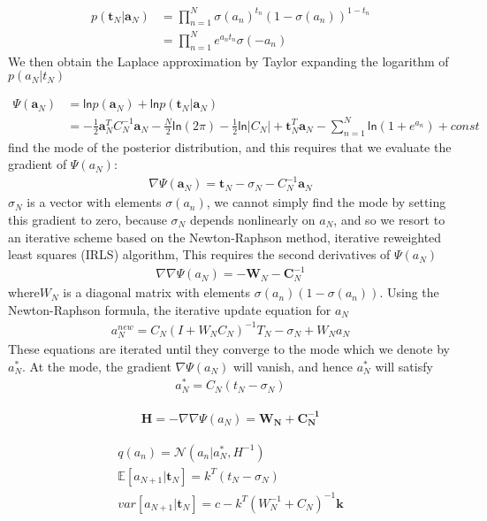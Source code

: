 \documentclass[a4paper]{article}
\begin{document}
\begin{align*}
p(\mathbf{t}_{N}|\mathbf{a}_N) &= \prod_{n=1}^N \sigma(a_n)^{t_n}(1-\sigma(a_n))^{1-t_n}\\
&= \prod_{n=1}^N e^{a_nt_n} \sigma(-a_n)
\end{align*}
We then obtain the Laplace approximation by Taylor expanding the
logarithm of $p(a_N|t_N)$

\begin{align*}
\Psi(\mathbf{a}_N) &= \mathsf{ln} p(\mathbf{a}_N) + \mathsf{ln} p(\mathbf{t}_{N}|\mathbf{a}_N)\\
&=-\frac{1}{2}\mathbf{a}_N^TC_N^{-1}\mathbf{a}_N
  -\frac{N}{2}\mathsf{ln}(2\pi) -\frac{1}{2}\mathsf{ln}|C_N| +
  \mathbf{t}_N^T\mathbf{a}_N - \sum_{n=1}^N \mathsf{ln} (1+e^{a_n}) + const
\end{align*}
find the mode of the posterior distribution, and this requires that we
evaluate the gradient of $\Psi(a_N)$:
\begin{align}
\nabla \Psi(\mathbf{a}_N) = \mathbf{t}_N - \sigma_N - C_N^{-1}\mathbf{a}_N
\end{align}
$\sigma_N$ is a vector with elements $\sigma(a_n)$, we cannot simply find the mode by
setting this gradient to zero, because $\sigma_N$ depends nonlinearly on $a_N$, and so we
resort to an iterative scheme based on the Newton-Raphson method,
iterative reweighted least squares (IRLS) algorithm, This requires the second
derivatives of $\Psi(a_N)$
\begin{align}
  \nabla\nabla \Psi(a_N) = -\mathbf{W}_N - \mathbf{C}_N^{-1}
\end{align}
where$W_N$ is a diagonal matrix with elements $\sigma(a_n)(1−\sigma(a_n))$.
Using the Newton-Raphson formula, the iterative update equation for $a_N$
\begin{align}
a_N^{new} = C_N(I+W_NC_N)^{-1} {T_N -\sigma_N + W_Na_N}
\end{align}
These equations are iterated until they converge to the mode which we
denote by $a_N^*$. At the mode, the gradient $\nabla \Psi(a_N)$ will
vanish, and hence $a_N^*$ will satisfy
\begin{align}
a_N^* = C_N(t_N - \sigma_N)
\end{align}

\begin{align}
\mathbf{H} = - \nabla\nabla\Psi(a_N) = \mathbf{W_N + C_N^{-1}}
\end{align}

\begin{align}
q(a_n) = \mathcal{N}(a_n|a_N^*, H^{-1})\\
\mathbb{E}[a_{N+1}|\mathbf{t}_N] = k^T(t_N - \sigma_N)\\
var[a_{N+1}|\mathbf{t}_N] = c - k^T(W_N^{-1} + C_N)^{-1} \mathbf{k}
\end{align}
\end{document}
